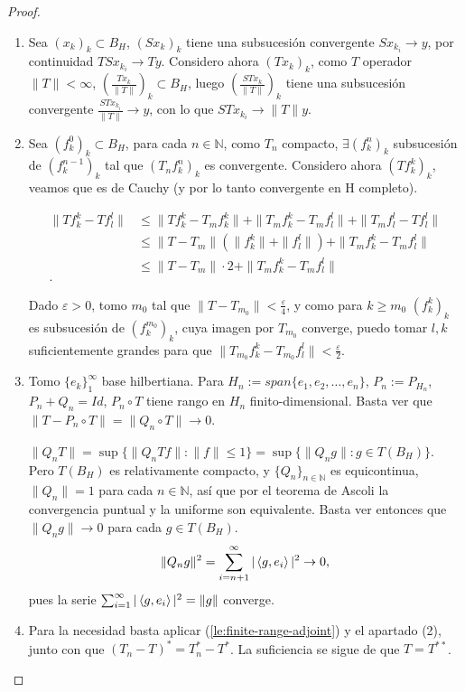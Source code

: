 \begin{proof}\hfill
  \begin{enumerate}
    \item Sea $(x_k)_k\subset B_H$, $(Sx_k)_k$ tiene una subsucesión convergente
      $Sx_{k_i}\to y$, por continuidad $TSx_{k_i}\to Ty$. Considero ahora
      $(Tx_k)_k$, como $T$ operador $\|T\|<\infty$, $\left( \frac{Tx_k}{\|T\|}
      \right)_k\subset B_H $, luego $\left( \frac{STx_k}{\|T\|} \right)_k$ tiene
      una subsucesión convergente $\frac{STx_{k_i}}{\|T\|}\to y$, con lo que
      $STx_{k_i}\to \|T\|y$.

    \item Sea $(f^0_k)_k\subset B_H$, para cada $n\in \mathbb{N}$, como $T_n$ 
      compacto, $\exists (f^{n}_k)_k$ subsucesión de $(f^{n-1}_k)_k$ tal que
      $(T_n f^n_k)_k$ es convergente. Considero ahora $(Tf_k^k)_k$, veamos que
      es de Cauchy (y por lo tanto convergente en H completo).

      \begin{align*}
        \|Tf_k^k - Tf_l^l\| & \le  \|Tf_k^k - T_mf_k^k\| + \|T_mf_k^k - T_mf_l^l\| + \|T_mf_l^l - Tf_l^l\| \\
                            & \le  \|T - T_m\|(\|f_k^k\|+\|f_l^l\|) + \|T_mf_k^k - T_mf_l^l\| \\
                            & \le  \|T - T_m\|\cdot 2 + \|T_mf_k^k - T_mf_l^l\| \\
      .\end{align*}

      Dado $\varepsilon>0$, tomo $m_0$ tal que
      $\|T-T_{m_0}\|<\frac{\varepsilon}{4}$, y como para $k\ge m_0$ $(f^k_k)_k$ es
      subsucesión de $(f_k^{m_0})_k$, cuya imagen por $T_{m_0}$ converge, puedo
      tomar $l,k$ suficientemente grandes para que $\|T_{m_0}f_k^k -
      T_{m_0}f_l^l\|<\frac{\varepsilon}{2}$.

    \item Tomo $\{e_k\}_1^\infty$ base hilbertiana. Para $H_n:=span
      \{e_1,e_2,\ldots,e_n\}$, $P_n:=P_{H_n}$, $P_n+Q_n=Id$, $P_n\circ T$ tiene
      rango en $H_n$ finito-dimensional. Basta ver que $\|T-P_n\circ
      T\|=\|Q_n\circ T\|\to 0$.

      $\|Q_nT\|=\sup \{\|Q_nT f\|: \|f\|\le 1\} =\sup \{\|Q_ng\|:g\in T(B_H)\}
      $. Pero $T(B_H)$ es relativamente compacto, y $\{Q_n\}_{n\in \mathbb{N}}$ 
      es equicontinua, $\|Q_n\|=1$ para cada $n\in \mathbb{N}$, así que por el
      teorema de Ascoli la convergencia puntual y la uniforme son equivalente.
      Basta ver entonces que $\|Q_ng\|\to 0$ para cada $g\in T(B_H)$.
       \[
       \|Q_ng\|^2=\sum_{i=n+1}^{\infty} |\left\langle g,e_i\right\rangle|^2\to 0
       ,\] 
       pues la serie $\sum_{i=1}^{\infty} |\left\langle g,e_i\right\rangle|^2=\|g\|$ converge.

     \item Para la necesidad basta aplicar (\ref{le:finite-range-adjoint}) y el
       apartado (2), junto con que $(T_n-T)^*=T_n^*-T^*$. La suficiencia se
       sigue de que  $T=T^{**}$.
  \end{enumerate}
\end{proof}

